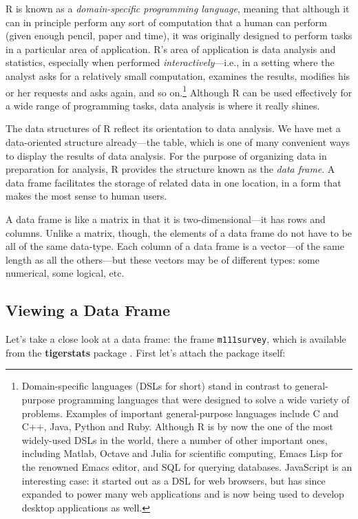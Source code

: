 \documentclass[]{book}
\let\rmarkdownfootnote\footnote%
\def\footnote{\protect\rmarkdownfootnote}
\theoremstyle{definition}
\theoremstyle{definition}
\theoremstyle{definition}
\theoremstyle{remark}
\begin{document}
{R is known as a \emph{domain-specific programming language}, meaning
that although it can in principle perform any sort of computation that a
human can perform (given enough pencil, paper and time), it was
originally designed to perform tasks in a particular area of
application. R's area of application is data analysis and statistics,
especially when performed \emph{interactively}---i.e., in a setting
where the analyst asks for a relatively small computation, examines the
results, modifies his or her requests and asks again, and so
on.\footnote{Domain-specific languages (DSLs for short) stand in
  contrast to general-purpose programming languages that were designed
  to solve a wide variety of problems. Examples of important
  general-purpose languages include C and C++, Java, Python and Ruby.
  Although R is by now the one of the most widely-used DSLs in the
  world, there a number of other important ones, including Matlab,
  Octave and Julia for scientific computing, Emacs Lisp for the renowned
  Emacs editor, and SQL for querying databases. JavaScript is an
  interesting case: it started out as a DSL for web browsers, but has
  since expanded to power many web applications and is now being used to
  develop desktop applications as well.} Although R can be used
effectively for a wide range of programming tasks, data analysis is
where it really shines.

The data structures of R reflect its orientation to data analysis. We
have met a data-oriented structure already---the table, which is one of
many convenient ways to display the results of data analysis. For the
purpose of organizing data in preparation for analysis, R provides the
structure known as the \emph{data frame}. A data frame
facilitates the storage of related data in one location, in a form that
makes the most sense to human users.

A data frame is like a matrix in that it is two-dimensional---it has
rows and columns. Unlike a matrix, though, the elements of a data frame
do not have to be all of the same data-type. Each column of a data frame
is a vector---of the same length as all the others---but these vectors
may be of different types: some numerical, some logical, etc.

\subsection{Viewing a Data Frame}\label{viewing-a-data-frame}

Let's take a close look at a data frame: the frame \texttt{m111survey},
which is available from the \textbf{tigerstats} package
\citep{R-tigerstats}. First let's attach the package itself:

}
\end{document}
